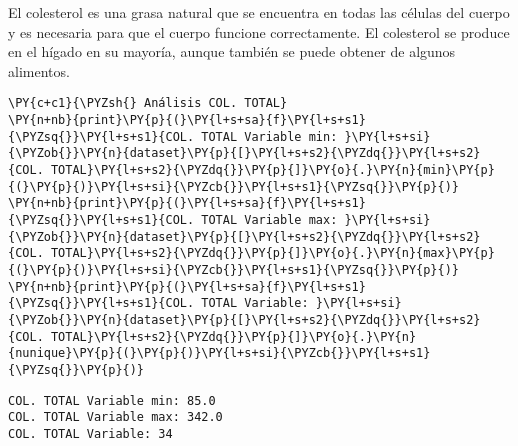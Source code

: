 El colesterol es una grasa natural que se encuentra en todas las células
del cuerpo y es necesaria para que el cuerpo funcione correctamente. El
colesterol se produce en el hígado en su mayoría, aunque también se
puede obtener de algunos alimentos.

    \begin{tcolorbox}[breakable, size=fbox, boxrule=1pt, pad at break*=1mm,colback=cellbackground, colframe=cellborder]
\begin{Verbatim}[commandchars=\\\{\}]
\PY{c+c1}{\PYZsh{} Análisis COL. TOTAL}
\PY{n+nb}{print}\PY{p}{(}\PY{l+s+sa}{f}\PY{l+s+s1}{\PYZsq{}}\PY{l+s+s1}{COL. TOTAL Variable min: }\PY{l+s+si}{\PYZob{}}\PY{n}{dataset}\PY{p}{[}\PY{l+s+s2}{\PYZdq{}}\PY{l+s+s2}{COL. TOTAL}\PY{l+s+s2}{\PYZdq{}}\PY{p}{]}\PY{o}{.}\PY{n}{min}\PY{p}{(}\PY{p}{)}\PY{l+s+si}{\PYZcb{}}\PY{l+s+s1}{\PYZsq{}}\PY{p}{)}
\PY{n+nb}{print}\PY{p}{(}\PY{l+s+sa}{f}\PY{l+s+s1}{\PYZsq{}}\PY{l+s+s1}{COL. TOTAL Variable max: }\PY{l+s+si}{\PYZob{}}\PY{n}{dataset}\PY{p}{[}\PY{l+s+s2}{\PYZdq{}}\PY{l+s+s2}{COL. TOTAL}\PY{l+s+s2}{\PYZdq{}}\PY{p}{]}\PY{o}{.}\PY{n}{max}\PY{p}{(}\PY{p}{)}\PY{l+s+si}{\PYZcb{}}\PY{l+s+s1}{\PYZsq{}}\PY{p}{)}
\PY{n+nb}{print}\PY{p}{(}\PY{l+s+sa}{f}\PY{l+s+s1}{\PYZsq{}}\PY{l+s+s1}{COL. TOTAL Variable: }\PY{l+s+si}{\PYZob{}}\PY{n}{dataset}\PY{p}{[}\PY{l+s+s2}{\PYZdq{}}\PY{l+s+s2}{COL. TOTAL}\PY{l+s+s2}{\PYZdq{}}\PY{p}{]}\PY{o}{.}\PY{n}{nunique}\PY{p}{(}\PY{p}{)}\PY{l+s+si}{\PYZcb{}}\PY{l+s+s1}{\PYZsq{}}\PY{p}{)}
\end{Verbatim}
\end{tcolorbox}

    \begin{Verbatim}[commandchars=\\\{\}]
COL. TOTAL Variable min: 85.0
COL. TOTAL Variable max: 342.0
COL. TOTAL Variable: 34
    \end{Verbatim}

